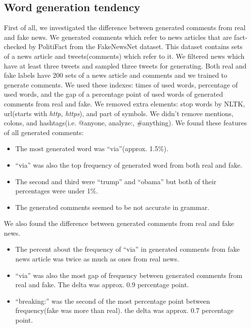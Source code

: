\documentclass[conference]{IEEEtran}
\begin{document}
\subsection{Word generation tendency}
\label{subsec:trend}
First of all, we investigated the difference between generated comments from real and fake news.
We generated comments which refer to news articles that are fact-checked by PolitiFact from the FakeNewsNet dataset\cite{Shu2018FakeNewsNetAD}.
This dataset contains sets of a news article and tweets(comments) which refer to it.
We filtered news which have at least three tweets and sampled three tweets for generating.
Both real and fake labels have 200 sets of a news article and comments and we trained to generate comments. 
We used these indexes: times of used words, percentage of used words, and the gap of a percentage point of used words of generated comments from real and fake.
We removed extra elements: stop words by NLTK, url(starts with \textit{http, https}), and part of symbols.
We didn't remove mentions, colons, and hashtags(i.e. @anyone, analyze:, \#anything).
We found these features of all generated comments:
\begin{itemize}[]
    \item The most generated word was ``via''(approx. 1.5\%).  
    \item ``via'' was also the top frequency of generated word from both real and fake. 
    \item The second and third were ``trump'' and ``obama'' but both of their percentages were under 1\%.
    \item The generated comments seemed to be not accurate in grammar.
\end{itemize}
We also found the difference between generated comments from real and fake news.
\begin{itemize}[]
    \item The percent about the frequency of ``via'' in generated comments from fake news article was twice as much as ones from real news.
    \item ``via'' was also the most gap of frequency between generated comments from real and fake.  The delta was approx. 0.9 percentage point.
    \item ``breaking:'' was the second of the most percentage point between frequency(fake was more than real). the delta was approx. 0.7 percentage point.
\end{itemize}
\end{document}

